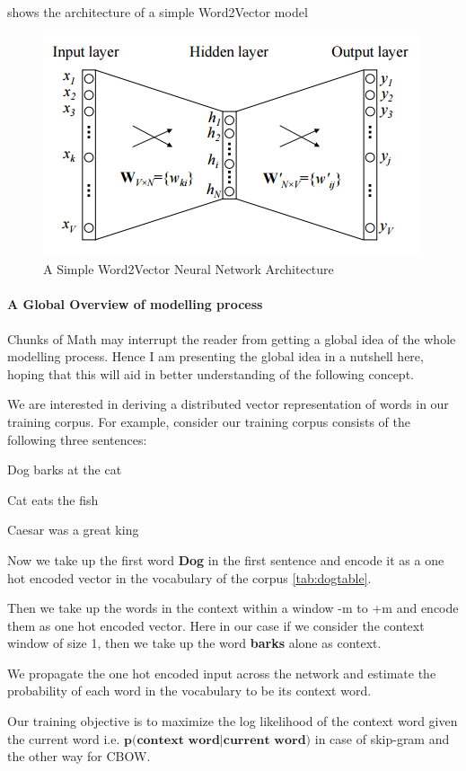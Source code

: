  shows the architecture of a simple Word2Vector model \cite{Rong2014}
\begin{figure}
  \centering
  \includegraphics{1_2_Word2Vec_Architecture}
  \caption{A Simple Word2Vector Neural Network Architecture}
  \label{fig:1_2_Word2Vec_Architecture}
\end{figure}

\paragraph*{A Global Overview of modelling process}
Chunks of Math may interrupt the reader from getting a global idea of the whole modelling process. Hence I am presenting the global idea in a nutshell here, hoping that this will aid in better understanding of the following concept.

We are interested in deriving a distributed vector representation of words in our training corpus. For example, consider our training corpus consists of the following three sentences:
\begin{myitemize}
    \item Dog barks at the cat
    \item Cat eats the fish
    \item Caesar was a great king
\end{myitemize}

\begin{myenumerate}
\item Now we take up the first word \textbf{Dog} in the first sentence and encode it as a one hot encoded vector in the vocabulary of the corpus \ref{tab:dogtable}. 
\item Then we take up the words in the context within a window -m to +m and encode them as one hot encoded vector. Here in our case if we consider the context window of size 1, then we take up the word \textbf{barks} alone as context.
\item We propagate the one hot encoded input across the network and estimate the probability of each word in the vocabulary to be its context word.
\item Our training objective is to maximize the log likelihood of the context word given the current word i.e. $\textbf{p(context word|current word)}$ in case of skip-gram and the other way for CBOW.     
\end{myenumerate}

